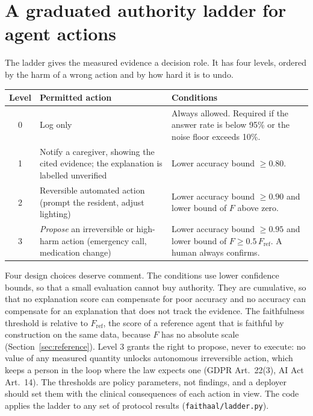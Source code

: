 \documentclass[11pt,a4paper]{article}
\begin{document}
\section{A graduated authority ladder for agent actions}
\label{sec:ladder}

The ladder gives the measured evidence a decision role. It has four levels, ordered by the harm of a wrong action and by how hard it is to undo.

\begin{center}
\small
\begin{tabular}{@{}cp{4.4cm}p{6.4cm}@{}}
\toprule
Level & Permitted action & Conditions \\
\midrule
0 & Log only & Always allowed. Required if the answer rate is below 95\% or the noise floor exceeds 10\%. \\
1 & Notify a caregiver, showing the cited evidence; the explanation is labelled unverified & Lower accuracy bound $\ge 0.80$. \\
2 & Reversible automated action (prompt the resident, adjust lighting) & Lower accuracy bound $\ge 0.90$ and lower bound of $F$ above zero. \\
3 & \emph{Propose} an irreversible or high-harm action (emergency call, medication change) & Lower accuracy bound $\ge 0.95$ and lower bound of $F\ge 0.5\,F_{\mathrm{ref}}$. A human always confirms. \\
\bottomrule
\end{tabular}
\end{center}

Four design choices deserve comment. The conditions use lower confidence bounds, so that a small evaluation cannot buy authority. They are cumulative, so that no explanation score can compensate for poor accuracy and no accuracy can compensate for an explanation that does not track the evidence. The faithfulness threshold is relative to $F_{\mathrm{ref}}$, the score of a reference agent that is faithful by construction on the same data, because $F$ has no absolute scale (Section~\ref{sec:reference}). Level 3 grants the right to propose, never to execute: no value of any measured quantity unlocks autonomous irreversible action, which keeps a person in the loop where the law expects one (GDPR Art.~22(3), AI Act Art.~14). The thresholds are policy parameters, not findings, and a deployer should set them with the clinical consequences of each action in view. The code applies the ladder to any set of protocol results (\texttt{faithaal/ladder.py}).
\end{document}
